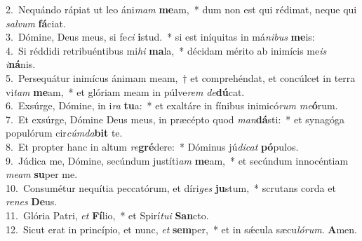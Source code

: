 {2.~}Nequándo rápiat ut leo áni\textit{mam} \textbf{me}am,~* dum non est qui rédimat, neque qui \textit{sal}\textit{vum} \textbf{fá}ciat.\\
{3.~}Dómine, Deus meus, si fe\textit{ci} \textbf{i}stud.~* si est iníquitas in má\textit{ni}\textit{bus} \textbf{me}is:\\
{4.~}Si réddidi retribuéntibus mi\textit{hi} \textbf{ma}la,~* décidam mérito ab inimícis me\textit{is} \textit{i}\textbf{ná}nis.\\
{5.~}Persequátur inimícus ánimam meam,~† et comprehéndat, et concúlcet in terra vi\textit{tam} \textbf{me}am,~* et glóriam meam in púlve\textit{rem} \textit{de}\textbf{dú}cat.\\
{6.~}Exsúrge, Dómine, in i\textit{ra} \textbf{tu}a:~* et exaltáre in fínibus inimicó\textit{rum} \textit{me}\textbf{ó}rum.\\
{7.~}Et exsúrge, Dómine Deus meus, in præcépto quod \textit{man}\textbf{dá}sti:~* et synagóga populórum cir\textit{cúm}\textit{da}\textbf{bit} te.\\
{8.~}Et propter hanc in altum \textit{re}\textbf{gré}dere:~* Dóminus jú\textit{di}\textit{cat} \textbf{pó}pulos.\\
{9.~}Júdica me, Dómine, secúndum justíti\textit{am} \textbf{me}am,~* et secúndum innocéntiam \textit{me}\textit{am} \textbf{su}per me.\\
{10.~}Consumétur nequítia peccatórum, et díri\textit{ges} \textbf{ju}stum,~* scrutans corda et \textit{re}\textit{nes} \textbf{De}us.\\
{11.~}Glória Patri, \textit{et} \textbf{Fí}lio,~* et Spirí\textit{tu}\textit{i} \textbf{San}cto.\\
{12.~}Sicut erat in princípio, et nunc, \textit{et} \textbf{sem}per,~* et in sǽcula sæcu\textit{ló}\textit{rum}. \textbf{A}men.\\

